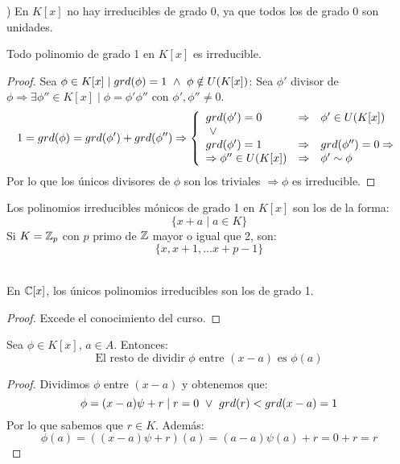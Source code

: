 ) En $K[x]$ no hay irreducibles de grado 0, ya que todos los de grado 0 son unidades.
\begin{prop}
    Todo polinomio de grado 1 en $K[x]$ es irreducible.
\begin{proof}
    Sea $\phi \in K[x] \mid grd(\phi)=1 \ \land \  \phi \notin U(K[x])$:\newline
    Sea $\phi'$ divisor de $\phi \Rightarrow \exists \phi'' \in K[x] \mid \phi = \phi'\phi''$ con $\phi',\phi''\neq 0$.\newline
    $$1 = grd(\phi) = grd(\phi') + grd(\phi'') \Rightarrow \left\{ \begin{array}{lll}
            grd(\phi') = 0                 & \Rightarrow & \phi' \in U(K[x])         \\
            \ \lor \                              &             &                           \\
            grd(\phi') = 1                 & \Rightarrow & grd(\phi'')=0 \Rightarrow \\
            \Rightarrow \phi'' \in U(K[x]) & \Rightarrow & \phi'\sim \phi
        \end{array}\right.$$
    Por lo que los únicos divisores de $\phi$ son los triviales $\Rightarrow \phi$ es irreducible.
\end{proof}
\end{prop}

Los polinomios irreducibles mónicos de grado 1 en $K[x]$ son los de la forma:
$$\{x+a \mid a \in K\}$$
Si $K=\mathbb Z_p$ con $p$ primo de $\mathbb Z$ mayor o igual que 2, son:
$$\{x, x+1, \ldots x+p-1\}$$

\begin{teo}
    \ \\
    En $\mathbb C[x]$, los únicos polinomios irreducibles son los de grado 1.
\begin{proof}
    Excede el conocimiento del curso.
\end{proof}
\end{teo}

\begin{teo}[de Ruffini]
    \label{teoRuffini}
    Sea $\phi \in K[x]$, $a \in A$. Entonces:
    $$\mbox{El resto de dividir } \phi \mbox{ entre } (x-a) \mbox{ es } \phi(a)$$
\begin{proof}
    Dividimos $\phi$ entre $(x-a)$ y obtenemos que:
    $$\phi = (x-a)\psi + r \mid r = 0 \ \lor \  grd(r)<grd(x-a)=1$$
    Por lo que sabemos que $r \in K$. Además:
    $$\phi(a) = ((x-a)\psi+r)(a) = (a-a)\psi(a) + r = 0 + r = r$$
\end{proof}
\end{teo}

